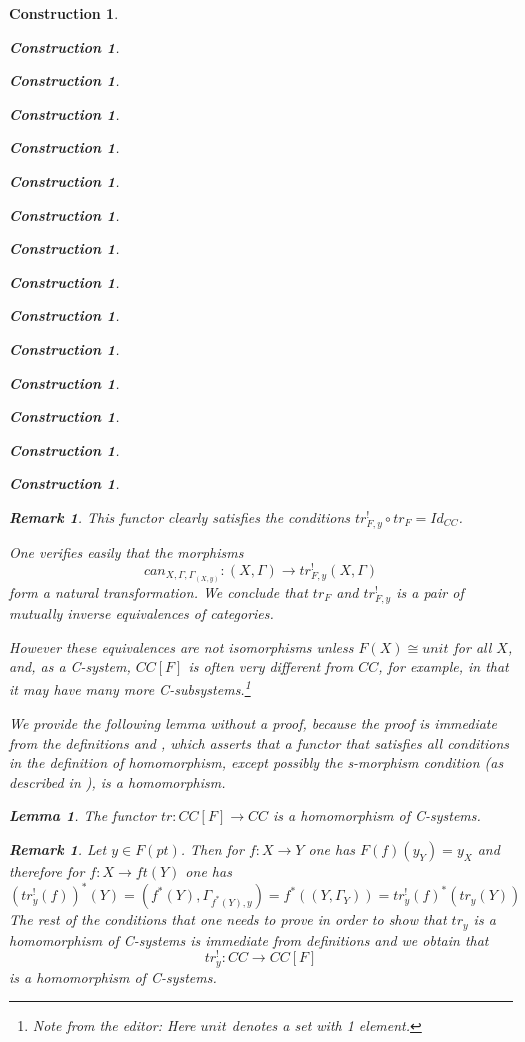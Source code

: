 \documentclass[onecolumn,12pt]{amsart}
\newtheorem{lemma}[proposition]{Lemma}
\newtheorem{remark}[proposition]{Remark}
\numberwithin{proposition}{subsection}
\newtheorem{construction}[proposition]{Construction}
\newcommand{\sr}{\rightarrow}
\newcommand{\editorfootnote}[1]{\footnote{Note from the editor: #1}}
\begin{document}
\begin{construction}
\begin{construction}
\begin{construction}
\begin{construction}
\begin{construction}
\begin{construction}
\begin{construction}
\begin{construction}
\begin{construction}
\begin{construction}
\begin{construction}
\begin{construction}
\begin{construction}
\begin{construction}
\begin{construction}
\begin{remark}
This functor clearly satisfies the conditions $tr^!_{F,y}\circ tr_F=Id_{CC}$.

One verifies easily that the morphisms 
%
$$can_{X,\Gamma,\Gamma_{(X,y)}}:(X,\Gamma)\sr tr^!_{F,y}(X,\Gamma)$$
%
form a natural transformation. We conclude that $tr_F$ and $tr^!_{F,y}$ is a
pair of mutually inverse equivalences of categories.

However these equivalences are not isomorphisms unless $F(X)\cong unit$ for all
$X$, and, as a C-system, $CC[F]$ is often very different from $CC$, for example,
in that it may have many more C-subsystems.\editorfootnote{Here $unit$ denotes a set with 1 element.}
\end{remark}
%
We provide the following lemma without a proof, because the proof is immediate
from the definitions and \cite[Lemma 3.4]{Cfromauniverse}, which asserts that a
functor that satisfies all conditions in the definition of homomorphism,
except possibly the s-morphism condition (as described in \cite{Cfromauniverse}), is a homomorphism.
%
\begin{lemma}
\label{2015.08.22.l4}
The functor $tr:CC[F]\sr CC$ is a homomorphism of C-systems.
\end{lemma}
%
\begin{remark}\rm
\label{2015.08.22.rem1} 
Let $y\in F(pt)$. Then for $f:X\sr Y$ one has $F(f)(y_{Y})=y_X$ and therefore for $f:X\sr ft(Y)$ one has
%
$$(tr^!_{y}(f))^*(Y)=(f^*(Y),\Gamma_{f^*(Y),y})=f^*((Y,\Gamma_Y))=tr^!_y(f)^*(tr_y(Y))$$
%
The rest of the conditions that one needs to prove in order to show that $tr_y$
is a homomorphism of C-systems is immediate from definitions and we obtain that
%
$$tr^!_y:CC\sr CC[F]$$
%
is a homomorphism of C-systems.  
\end{remark}
%


\end{construction}
\end{construction}
\end{construction}
\end{construction}
\end{construction}
\end{construction}
\end{construction}
\end{construction}
\end{construction}
\end{construction}
\end{construction}
\end{construction}
\end{construction}
\end{construction}
\end{construction}
\end{document}
